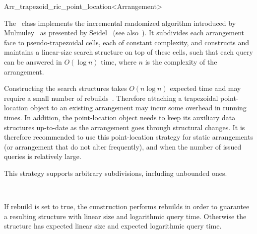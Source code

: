 
\ccRefPageBegin

\begin{ccRefClass}{Arr_trapezoid_ric_point_location<Arrangement>}
\label{arr_ref:trap_pl}

\ccDefinition

The \ccRefName\ class implements the incremental randomized algorithm
introduced by Mulmuley~\cite{m-fppa-90} as presented by
Seidel~\cite{s-sfira-91} (see also~\cite[Chapter~6]{bkos-cgaa-00}).
It subdivides each arrangement face to pseudo-trapezoidal cells, each
of constant complexity, and constructs and maintains a linear-size search
structure on top of these cells, such that each query can be answered
in $O(\log n)$ time, where $n$ is the complexity of the arrangement.

Constructing the search structures takes $O(n \log n)$ expected time 
and may require a small number of rebuilds~\cite{hkh-iiplgtds-12}. Therefore
attaching a trapezoidal point-location object to an existing arrangement
may incur some overhead in running times. In addition, the point-location
object needs to keep its auxiliary data structures up-to-date as the
arrangement goes through structural changes. It is therefore recommended
to use this point-location strategy for static arrangements (or arrangement
that do not alter frequently), and when the number of issued queries
is relatively large.

This strategy supports arbitrary subdivisions, including unbounded ones.


\ccIsModel
   \\

\ccCreation
{}

    {If rebuild is set to true, the cunstruction performs rebuilds in order to guarantee a resulting structure with linear size and logarithmic query time. 
Otherwise the structure has expected linear size and expected logarithmic query time.}


\end{ccRefClass}
